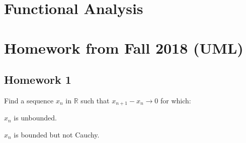\documentclass[crop=false,class=article,oneside]{standalone}
\begin{document}
    \ifx\ifmathcoursesfunctional\undefined
        \section*{Functional Analysis}
        \setcounter{section}{3}
    \else
        \section{Homework from Fall 2018 (UML)}
    \fi
    \subsection{Homework 1}
        \begin{problem}
            Find a sequence $x_{n}$ in $\mathbb{R}$
            such that $x_{n+1}-x_{n}\rightarrow{0}$
            for which:
            \begin{enumerate}
                \begin{multicols}{2}
                    \item $x_{n}$ is unbounded.
                    \item $x_{n}$ is bounded but
                          not Cauchy.
                \end{multicols}
            \end{enumerate}
        \end{problem}
\end{document}
